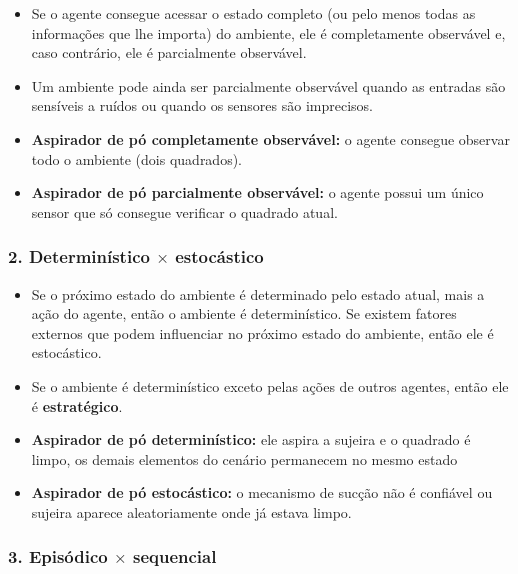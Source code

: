 \begin{itemize}
	\item Se o agente consegue acessar o estado completo (ou pelo menos todas as informações que lhe importa) do ambiente, ele é completamente observável e, caso contrário, ele é parcialmente observável.
	
	\item Um ambiente pode ainda ser parcialmente observável quando as entradas são sensíveis a ruídos ou quando os sensores são imprecisos.
	
	\item \textbf{Aspirador de pó completamente observável:} o agente consegue observar todo o ambiente (dois quadrados).
	\item \textbf{Aspirador de pó parcialmente observável:} o agente possui um único sensor que só consegue verificar o quadrado atual.
\end{itemize}

\subsubsection{2. Determinístico $\times$ estocástico}

\begin{itemize}
	\item Se o próximo estado do ambiente é determinado pelo estado atual, mais a ação do agente, então o ambiente é determinístico. Se existem fatores externos que podem influenciar no próximo estado do ambiente, então ele é estocástico.
	
	\item Se o ambiente é determinístico exceto pelas ações de outros agentes, então ele é \textbf{estratégico}.
	
	\item \textbf{Aspirador de pó determinístico:} ele aspira a sujeira e o quadrado é limpo, os demais elementos do cenário permanecem no mesmo estado
	\item \textbf{Aspirador de pó estocástico:} o mecanismo de sucção não é confiável ou sujeira aparece aleatoriamente onde já estava limpo.
\end{itemize}

\subsubsection{3. Episódico $\times$ sequencial}

